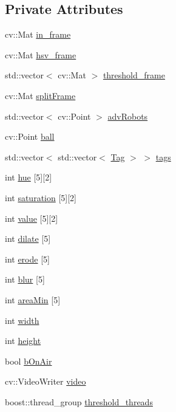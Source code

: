 \subsection*{Private Attributes}
\begin{DoxyCompactItemize}
\item 
cv\+::\+Mat \hyperlink{class_vision_a905e6a0333e4931dfd2e0e44b07b51c9}{in\+\_\+frame}
\item 
cv\+::\+Mat \hyperlink{class_vision_a1bbcad0a1286863da12d3580492b4a8d}{hsv\+\_\+frame}
\item 
std\+::vector$<$ cv\+::\+Mat $>$ \hyperlink{class_vision_a2fee2db2d4fe0cee6b2de36ee0eb6c7f}{threshold\+\_\+frame}
\item 
cv\+::\+Mat \hyperlink{class_vision_a5099dad8e3d8cb0ec58083a47a4171a8}{split\+Frame}
\item 
std\+::vector$<$ cv\+::\+Point $>$ \hyperlink{class_vision_ac6fb7fc6bde1436ef63c255858d690a4}{adv\+Robots}
\item 
cv\+::\+Point \hyperlink{class_vision_a525356abf07741955e63faffff9740af}{ball}
\item 
std\+::vector$<$ std\+::vector$<$ \hyperlink{class_tag}{Tag} $>$ $>$ \hyperlink{class_vision_acc5bbdf18ba36cc516c17999308be267}{tags}
\item 
int \hyperlink{class_vision_a557114ed93889df7c09fe7add7a2fa1f}{hue} \mbox{[}5\mbox{]}\mbox{[}2\mbox{]}
\item 
int \hyperlink{class_vision_a71a7f9859283e916a0dfb1467eaf5b13}{saturation} \mbox{[}5\mbox{]}\mbox{[}2\mbox{]}
\item 
int \hyperlink{class_vision_ad76f296d21c0758ed68429ca8b237b03}{value} \mbox{[}5\mbox{]}\mbox{[}2\mbox{]}
\item 
int \hyperlink{class_vision_a406af58255882218a4d49f41b7e3a67a}{dilate} \mbox{[}5\mbox{]}
\item 
int \hyperlink{class_vision_a441302204181d31885b611e10ea92489}{erode} \mbox{[}5\mbox{]}
\item 
int \hyperlink{class_vision_a48d1a64140429848f9a75a9d46c6e920}{blur} \mbox{[}5\mbox{]}
\item 
int \hyperlink{class_vision_a674b5bf7f6570f5b8e053ee28a9721ff}{area\+Min} \mbox{[}5\mbox{]}
\item 
int \hyperlink{class_vision_ac82a1da77a8b08d112e5c4688bd70c3d}{width}
\item 
int \hyperlink{class_vision_aa6f52191ab439505b6156835594f1861}{height}
\item 
bool \hyperlink{class_vision_a1eb56f5e3433ca3dce53fe315b845979}{b\+On\+Air}
\item 
cv\+::\+Video\+Writer \hyperlink{class_vision_a65230f76c9af171a0a9faba81b57f3d5}{video}
\item 
boost\+::thread\+\_\+group \hyperlink{class_vision_a2be0ca7754ab9d3c7a71041f87d43b1e}{threshold\+\_\+threads}
\end{DoxyCompactItemize}
